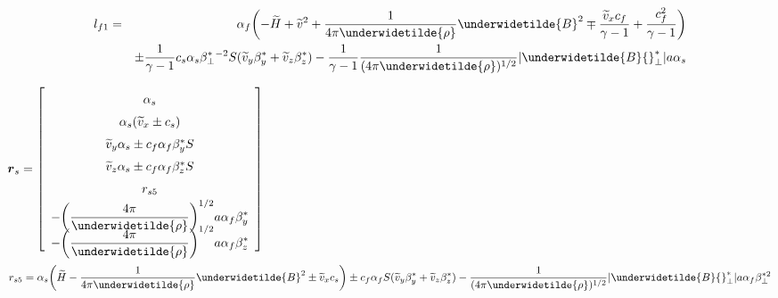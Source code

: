 \begin{center}
\begin{eqnarray}
\displaystyle
l_{f1} &=& \alpha_{f} \biggl( - \widetilde{H} + \widetilde{v}^2 + 
\frac1{4 \pi \underwidetilde{\rho}} \underwidetilde{B}^2
\mp \frac{\widetilde{v}_{x} c_{f}}{\gamma -1} + \frac{c_{f}^2}{\gamma -1} 
\biggr) \nonumber \\ 
&& \pm \frac1{\gamma -1} c_{s} \alpha_{s} \beta^{\ast}_{\bot} {}^{-2} S 
(\widetilde{v}_{y} \beta_{y}^{\ast} + \widetilde{v}_{z} \beta_{z}^{\ast})
- \frac1{\gamma -1} \frac1{(4 \pi \underwidetilde{\rho})^{1/2}} 
| \underwidetilde{B} {}^{\ast}_{\bot} | a \alpha_{s} \nonumber
\end{eqnarray}
\end{center}

\newpage

\begin{center}
$\renewcommand{\arraystretch}{1.5}
\mbox{\boldmath $r$}_{s} =
\left[
\begin{array}{c}
\alpha_{s} \\
\alpha_{s} ( \widetilde{v}_{x} \pm c_{s} ) \\
\widetilde{v}_{y} \alpha_{s} \pm c_{f} \alpha_{f} \beta^{\ast}_{y} S  \\
\widetilde{v}_{z} \alpha_{s} \pm c_{f} \alpha_{f} \beta^{\ast}_{z} S  \\
r_{s5} \\
\displaystyle
- \biggl( \frac{4 \pi}{\underwidetilde{\rho}} \biggr)^{1/2}
a \alpha_{f} \beta^{\ast}_{y} \vspace{-6pt} \\
\displaystyle
- \biggl( \frac{4 \pi}{\underwidetilde{\rho}} \biggr)^{1/2}
a \alpha_{f} \beta^{\ast}_{z} \vspace{-6pt} \\
\end{array}
\right]$ 

\begin{center}
\begin{eqnarray}
\displaystyle
r_{s5} = \alpha_{s} \biggl( \widetilde{H} - \frac1
{4 \pi \underwidetilde{\rho}} \underwidetilde{B}^2 
\pm \widetilde{v}_{x} c_{s} \biggr)
\pm c_{f} \alpha_{f} S ( \widetilde{v}_{y} \beta^{\ast}_{y} + 
\widetilde{v}_{z} \beta^{\ast}_{z} )
- \frac1{( 4 \pi \underwidetilde{\rho})^{1/2}} 
| \underwidetilde{B}{}_{\bot}^{\ast} |
a \alpha_{f} \beta^{\ast 2}_{\bot} \nonumber
\end{eqnarray}
\end{center}


\end{center}
